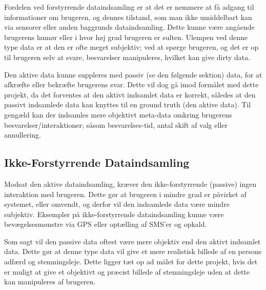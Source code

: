Fordelen ved forstyrrende dataindsamling er at det er nemmere at få adgang til informationer om brugeren, og dennes tilstand, som man ikke umiddelbart kan via sensorer eller anden baggrunds dataindsamling.
Dette kunne være angående brugerens humør eller i hvor høj grad brugeren er sulten.
Ulempen ved denne type data er at den er ofte meget subjektiv; ved at spørge brugeren, og det er op til brugeren selv at svare, besvarelser manipuleres, hvilket kan give dirty data.

Den aktive data kunne suppleres med passiv (se den følgende sektion) data, for at afkræfte eller bekræfte brugerens svar.
Dette vil dog gå imod formålet med dette projekt, da det forventes at den aktivt indsamlet data er korrekt, således at den passivt indsamlede data kan knyttes til en ground truth (den aktive data).
Til gengæld kan der indsamles mere objektivt meta-data omkring brugerens besvarelser/interaktioner; såsom besvarelses-tid, antal skift af valg eller annullering.

\subsection{Ikke-Forstyrrende Dataindsamling}
Modsat den aktive dataindsamling, kræver den ikke-forstyrrende (passive)  ingen interaktion med brugeren.
Dette gør at brugeren i mindre grad er påvirket af systemet, eller omvendt, og derfor vil den indsamlede data være mindre subjektiv.
Eksempler på ikke-forstyrrende dataindsamling kunne være bevægelsesmønstre via GPS eller optælling af SMS'er og opkald.

Som sagt vil den passive data oftest være mere objektiv end den aktivt indsamlet data.
Dette gør at denne type data vil give et mere realistisk billede af en persons adfærd og stemningsleje.
Dette ligger tæt op ad målet for dette projekt, hvis det er muligt at give et objektivt og præcist billede af stemningsleje uden at dette kan manipuleres af brugeren.

